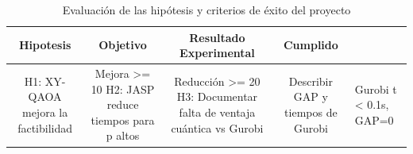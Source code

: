 \begin{table}[htbp]
  \centering
  \caption{Evaluación de las hipótesis y criterios de éxito del proyecto}
  \label{tab:hipotesis_exito}
  \begin{tabular}{cccc}
    \toprule
    Hipotesis & Objetivo & Resultado Experimental & Cumplido \\
    \midrule
    H1: XY-QAOA mejora la factibilidad & Mejora >= 10%
    H2: JASP reduce tiempos para p altos & Reducción >= 20%
    H3: Documentar falta de ventaja cuántica vs Gurobi & Describir GAP y tiempos de Gurobi & Gurobi t < 0.1s, GAP=0%
    \bottomrule
  \end{tabular}
\end{table}